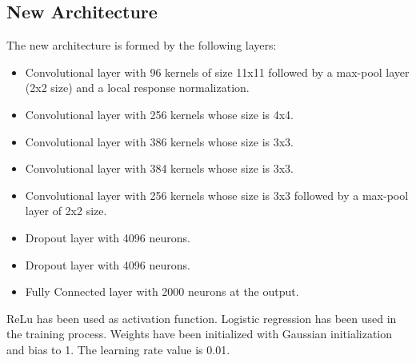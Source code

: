 \subsection{New Architecture} \label{subsec:ejecucion1}
The new architecture is formed by the following layers:
\begin{itemize}[itemsep=2pt,topsep=8pt,parsep=0pt,partopsep=20pt]
\item Convolutional layer with 96 kernels of size 11x11 followed by a max-pool layer (2x2 size) and a local response normalization.
\item Convolutional layer with 256 kernels whose size is 4x4.
\item Convolutional layer with 386 kernels whose size is 3x3.
\item Convolutional layer with 384 kernels whose size is 3x3.
\item Convolutional layer with 256 kernels whose size is 3x3 followed by a max-pool layer of 2x2 size.
\item Dropout layer with 4096 neurons.
\item Dropout layer with 4096 neurons.
\item Fully Connected layer with 2000 neurons at the output.
\end{itemize}

ReLu has been used as activation function. Logistic regression has been used in the training process. Weights have been initialized with Gaussian initialization and bias to 1. The learning rate value is 0.01.\\

